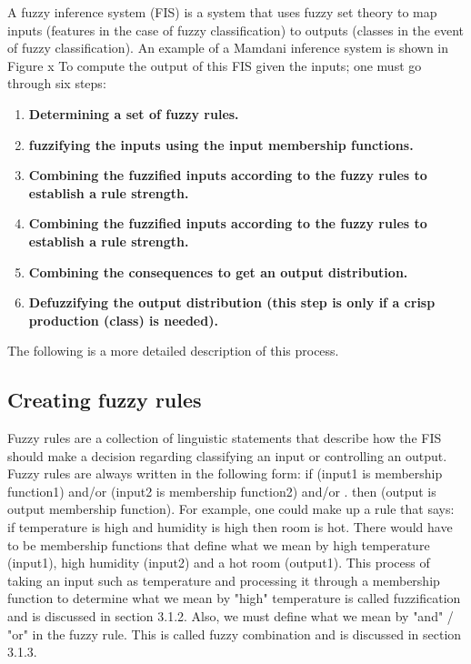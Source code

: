 A fuzzy inference system (FIS) is a system that uses fuzzy set theory to map
inputs (features in the case of fuzzy classification) to outputs (classes in the
event of fuzzy classification). An example of a Mamdani inference system is
shown in Figure x To compute the output of this FIS given the inputs; one must
go through six steps:

\begin{enumerate}
\item \textbf{Determining a set of fuzzy rules.}
\item \textbf{fuzzifying the inputs using the input membership functions.}
\item \textbf{Combining the fuzzified inputs according to the fuzzy rules to establish a rule strength.}
\item \textbf{Combining the fuzzified inputs according to the fuzzy rules to establish a rule strength.}
\item \textbf{Combining the consequences to get an output distribution.}
\item \textbf{Defuzzifying the output distribution (this step is only if a crisp production (class) is needed).}
\end{enumerate}

The following is a more detailed description of this process.

\subsection{Creating fuzzy rules}

Fuzzy rules are a collection of linguistic
statements that describe how the FIS should make a decision regarding
classifying an input or controlling an output. Fuzzy rules are always written in
the following form: if (input1 is membership function1) and/or (input2 is
membership function2) and/or . then (output is output membership function). For
example, one could make up a rule that says: if temperature is high and humidity
is high then room is hot. There would have to be membership functions that
define what we mean by high temperature (input1), high humidity (input2) and a
hot room (output1). This process of taking an input such as temperature and
processing it through a membership function to determine what we mean by "high"
temperature is called fuzzification and is discussed in section 3.1.2. Also, we
must define what we mean by "and" / "or" in the fuzzy rule. This is called fuzzy
combination and is discussed in section 3.1.3.

